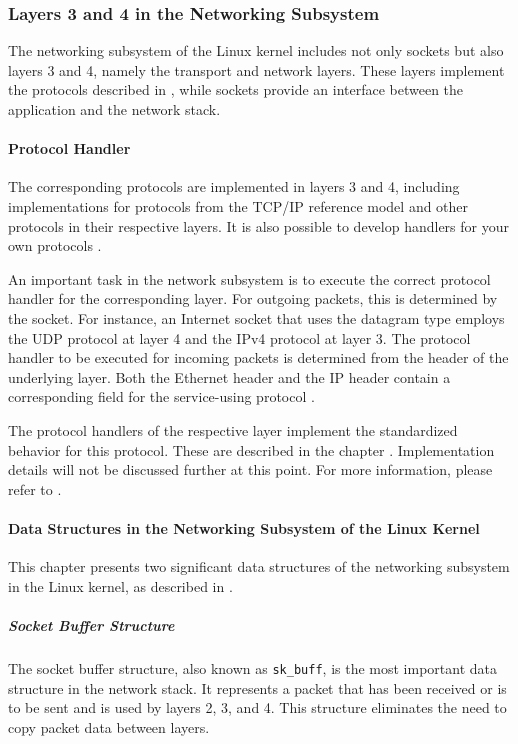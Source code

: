 \subsubsection{Layers 3 and 4 in the Networking Subsystem}
The networking subsystem of the Linux kernel includes not only sockets but also layers 3 and 4, namely the transport and network layers. These layers implement the protocols described in \label{chap:ProtosRefModel}, while sockets provide an interface between the application and the network stack.

\paragraph{Protocol Handler}
The corresponding protocols are implemented in layers 3 and 4, including implementations for protocols from the TCP/IP reference model and other protocols in their respective layers. It is also possible to develop handlers for your own protocols \cite{lins06}.

An important task in the network subsystem is to execute the correct protocol handler for the corresponding layer. For outgoing packets, this is determined by the socket. For instance, an Internet socket that uses the datagram type employs the UDP protocol at layer 4 and the IPv4 protocol at layer 3. The protocol handler to be executed for incoming packets is determined from the header of the underlying layer. Both the Ethernet header and the IP header contain a corresponding field for the service-using protocol \cite{lins06}.

The protocol handlers of the respective layer implement the standardized behavior for this protocol. These are described in the chapter \label{chap:ProtosRefModel}. Implementation details will not be discussed further at this point. For more information, please refer to \cite{lins01}.

\paragraph{Data Structures in the Networking Subsystem of the Linux Kernel}
This chapter presents two significant data structures of the networking subsystem in the Linux kernel, as described in \cite{lins06}.

\subparagraph{Socket Buffer Structure}
The socket buffer structure, also known as \texttt{sk\_buff}, is the most important data structure in the network stack. It represents a packet that has been received or is to be sent and is used by layers 2, 3, and 4. This structure eliminates the need to copy packet data between layers.

